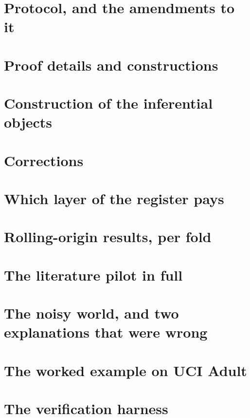 \appendix

\section{Protocol, and the amendments to it}
\label{app:protocol}


\section{Proof details and constructions}
\label{app:props}


\section{Construction of the inferential objects}
\label{app:objects}


\section{Corrections}
\label{app:corrections}


\section{Which layer of the register pays}
\label{app:layers}


\section{Rolling-origin results, per fold}
\label{app:rolling}


\section{The literature pilot in full}
\label{app:pilot}


\section{The noisy world, and two explanations that were wrong}
\label{app:noisy}


\section{The worked example on UCI Adult}
\label{app:worked}


\section{The verification harness}
\label{app:verifier}






